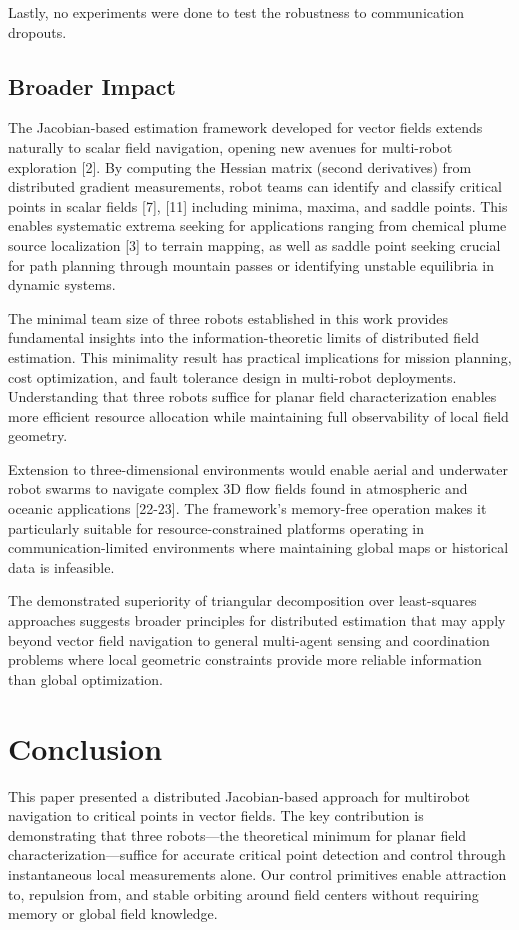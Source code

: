 \documentclass[lettersize,journal]{IEEEtran}
\begin{document}
Lastly, no experiments were done to test the robustness to communication dropouts.

\subsection{Broader Impact}

The Jacobian-based estimation framework developed for vector fields extends naturally to scalar field navigation, opening new avenues for multi-robot exploration [2]. By computing the Hessian matrix (second derivatives) from distributed gradient measurements, robot teams can identify and classify critical points in scalar fields [7], [11] including minima, maxima, and saddle points. This enables systematic extrema seeking for applications ranging from chemical plume source localization [3] to terrain mapping, as well as saddle point seeking crucial for path planning through mountain passes or identifying unstable equilibria in dynamic systems.

The minimal team size of three robots established in this work provides fundamental insights into the information-theoretic limits of distributed field estimation. This minimality result has practical implications for mission planning, cost optimization, and fault tolerance design in multi-robot deployments. Understanding that three robots suffice for planar field characterization enables more efficient resource allocation while maintaining full observability of local field geometry.

Extension to three-dimensional environments would enable aerial and underwater robot swarms to navigate complex 3D flow fields found in atmospheric and oceanic applications [22-23]. The framework's memory-free operation makes it particularly suitable for resource-constrained platforms operating in communication-limited environments where maintaining global maps or historical data is infeasible.

The demonstrated superiority of triangular decomposition over least-squares approaches suggests broader principles for distributed estimation that may apply beyond vector field navigation to general multi-agent sensing and coordination problems where local geometric constraints provide more reliable information than global optimization.




\section{Conclusion}
\noindent This paper presented a distributed Jacobian-based approach for multirobot navigation to critical points in vector fields. The key contribution is demonstrating that three robots—the theoretical minimum for planar field characterization—suffice for accurate critical point detection and control through instantaneous local measurements alone. Our control primitives enable attraction to, repulsion from, and stable orbiting around field centers without requiring memory or global field knowledge.
\end{document}
